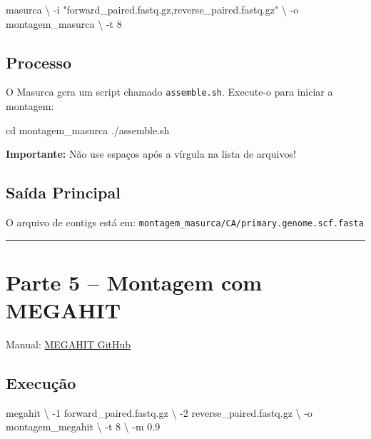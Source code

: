 \documentclass[
  brazilian,
  letterpaper,
  DIV=11,
  numbers=noendperiod]{scrartcl}
\newenvironment{Shaded}{\begin{snugshade}}{\end{snugshade}}
\newcommand{\AttributeTok}[1]{\textcolor[rgb]{0.40,0.45,0.13}{#1}}
\newcommand{\BuiltInTok}[1]{\textcolor[rgb]{0.00,0.23,0.31}{#1}}
\newcommand{\DataTypeTok}[1]{\textcolor[rgb]{0.68,0.00,0.00}{#1}}
\newcommand{\ExtensionTok}[1]{\textcolor[rgb]{0.00,0.23,0.31}{#1}}
\newcommand{\NormalTok}[1]{\textcolor[rgb]{0.00,0.23,0.31}{#1}}
\newcommand{\StringTok}[1]{\textcolor[rgb]{0.13,0.47,0.30}{#1}}
\begin{document}
\begin{Shaded}
\begin{Highlighting}[]
\ExtensionTok{masurca} \DataTypeTok{\textbackslash{}}
    \AttributeTok{{-}i} \StringTok{"forward\_paired.fastq.gz,reverse\_paired.fastq.gz"} \DataTypeTok{\textbackslash{}}
    \AttributeTok{{-}o}\NormalTok{ montagem\_masurca }\DataTypeTok{\textbackslash{}}
    \AttributeTok{{-}t}\NormalTok{ 8}
\end{Highlighting}
\end{Shaded}

\subsection{Processo}\label{processo}

O Masurca gera um script chamado \texttt{assemble.sh}. Execute-o para
iniciar a montagem:

\begin{Shaded}
\begin{Highlighting}[]
\BuiltInTok{cd}\NormalTok{ montagem\_masurca}
\ExtensionTok{./assemble.sh}
\end{Highlighting}
\end{Shaded}

\textbf{Importante:} Não use espaços após a vírgula na lista de
arquivos!

\subsection{Saída Principal}\label{sauxedda-principal-1}

O arquivo de contigs está em:
\texttt{montagem\_masurca/CA/primary.genome.scf.fasta}

\begin{center}\rule{0.5\linewidth}{0.5pt}\end{center}

\section{Parte 5 -- Montagem com
MEGAHIT}\label{parte-5-montagem-com-megahit}

Manual: \href{https://github.com/voutcn/megahit}{MEGAHIT GitHub}

\subsection{Execução}\label{execuuxe7uxe3o-3}

\begin{Shaded}
\begin{Highlighting}[]
\ExtensionTok{megahit} \DataTypeTok{\textbackslash{}}
    \AttributeTok{{-}1}\NormalTok{ forward\_paired.fastq.gz }\DataTypeTok{\textbackslash{}}
    \AttributeTok{{-}2}\NormalTok{ reverse\_paired.fastq.gz }\DataTypeTok{\textbackslash{}}
    \AttributeTok{{-}o}\NormalTok{ montagem\_megahit }\DataTypeTok{\textbackslash{}}
    \AttributeTok{{-}t}\NormalTok{ 8 }\DataTypeTok{\textbackslash{}}
    \AttributeTok{{-}m}\NormalTok{ 0.9}
\end{Highlighting}
\end{Shaded}
\end{document}
